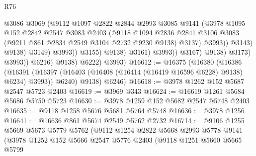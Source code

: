 \begin{lexlean}{R76}
\begin{coremodule}
                                          @3086
                                          @3069
                                          (@9112
                                            @1097
                                            @2822
                                            @2844
                                            @2993
                                            @3085
                                            @9141
                                            (@3978
                                              @1095
                                              @152
                                              @2842
                                              @2547
                                              @3083
                                              @2403
                                              (@9118
                                                @1094
                                                @2836
                                                @2841
                                                @3106
                                                @3083
                                                (@9211 @861 @2834 @2549 @3104 @2732 @9230 @9138)
                                                @3137)
                                              @3993))
                                          @3143)
                                        @9138)
                                      @3149)
                                    @3993))
                                @3155)
                              @9138)
                            @3161)
                          @3993))
                      @3167)
                    @9138)
                  @3173)
                @3993))
            @6216)
          @9138)
        @6222)
      @3993)
@16612 := @16375
    (@16380
      (@16386
        (@16391 (@16397 (@16403 (@16408 (@16414 (@16419 @16596 @6228) @9138) @6234) @3993)) @6240)
        @9138)
      @6246)
@16618 := @3978 @1262 @152 @5687 @2547 @5723 @2403
@16619 := @3969 @343
@16624 := @16619 @1261 @5684 @5686 @5750 @5723
@16630 := @3978 @1259 @152 @5682 @2547 @5748 @2403
@16635 := @9118 @1258 @5676 @5681 @5764 @5748
@16636 := @3978 @1256
@16641 := @16636 @861 @5674 @2549 @5762 @2732
@16714 := @9106
    @1255
    @5669
    @5673
    @5779
    @5762
    (@9112
      @1254
      @2822
      @5668
      @2993
      @5778
      @9141
      (@3978
        @1252
        @152
        @5666
        @2547
        @5776
        @2403
        (@9118
          @1251
          @5660
          @5665
          @5799

\end{coremodule}
\end{lexlean}
